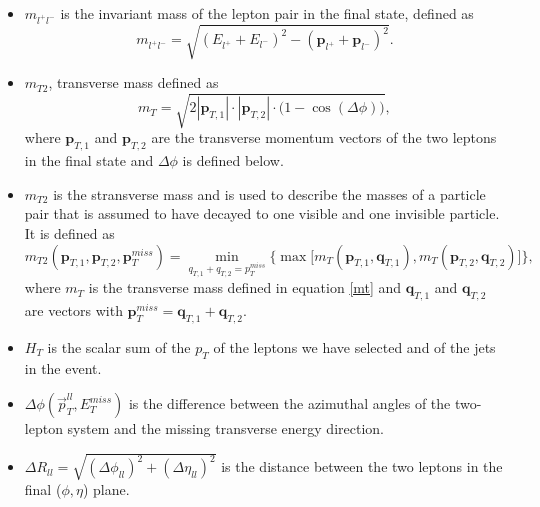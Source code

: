 \begin{itemize}
    \item $m_{l^+l^-}$ is the invariant mass of the lepton pair in the final state, defined as 
            \begin{equation}
                m_{l^+l^-} = \sqrt{(E_{l^+} + E_{l^-})^2 - (\mathbf{p}_{l^+} + \mathbf{p}_{l^-})^2}.
            \end{equation}
            
    \item $m_{T2}$, transverse mass defined as 
            \begin{equation}
                \label{eq:mt}
                m_T = \sqrt{2 |\mathbf{p}_{T,1}| \cdot |\mathbf{p}_{T,2}| \cdot \big(1-\cos(\Delta\phi)\big)},
            \end{equation}
        where $\mathbf{p}_{T,1}$ and $\mathbf{p}_{T,2}$ are the transverse momentum vectors of the two leptons in the final state and $\Delta \phi$ is defined below.
    \item $m_{T2}$ is the stransverse mass \cite{Lester:1999tx, Barr:2003rg} and is used to describe the masses of a particle pair that is assumed to have decayed to one visible and one invisible particle. It is defined as 
    \begin{equation*}
        m_{T2}(\mathbf{p}_{T,1}, \mathbf{p}_{T,2}, \mathbf{p}_{T}^{miss}) = \min_{q_{T,1} + q_{T,2} = p_T^{miss}} \bigg\{\max\big[m_T(\mathbf{p}_{T,1}, \mathbf{q}_{T,1}), m_T(\mathbf{p}_{T,2}, \mathbf{q}_{T,2})\big]\bigg\},
    \end{equation*}
    where $m_T$ is the transverse mass defined in equation \ref{mt} and $\mathbf{q}_{T,1}$ and $\mathbf{q}_{T,2}$ are vectors with $\mathbf{p}_{T}^{miss} = \mathbf{q}_{T,1} + \mathbf{q}_{T,2}$. 
    \item  $H_T$ is the scalar sum of the $p_T$ of the leptons we have selected and of the jets in the event.
    \item  $\Delta \phi (\Vec{p}_T^{ll}, E_T^{miss})$ is the difference between the azimuthal angles of the two-lepton system and the missing transverse energy direction.
    \item $\Delta R_{ll} = \sqrt{(\Delta\phi_{ll})^2 + (\Delta \eta_{ll})^2}$ is the distance between the two leptons in the final ($\phi, \eta$) plane.
\end{itemize}


   
  
    







